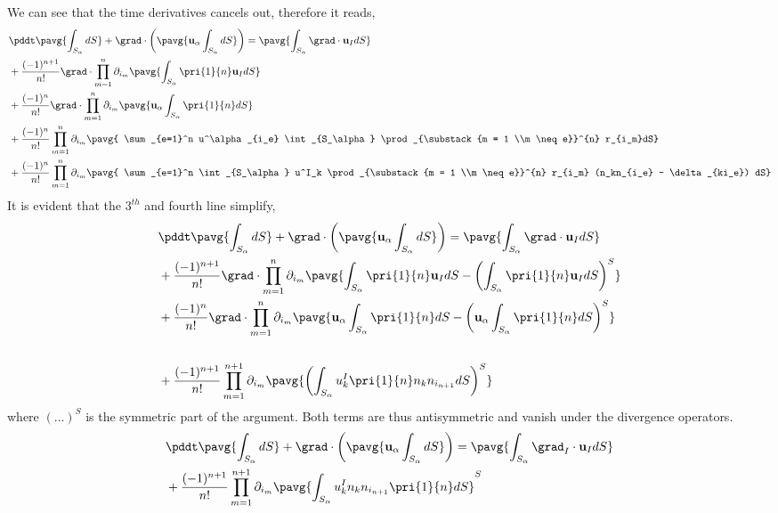 We can see that the time derivatives cancels out, therefore it reads, 
\begin{align*}
    &\pddt \pavg{\int_{S_\alpha} dS}
     + \grad \cdot \left(
         \pavg{\textbf{u}_\alpha \int_{S_\alpha} dS} 
    \right)
    = \pavg{\int_{S_\alpha} \grad \cdot \textbf{u}_I dS} \\
    &+ \frac{(-1)^{n+1}}{n!}
    \grad\cdot\prod^{n}_{m=1}
    \partial_{i_m}
    \pavg{
    \int_{S_\alpha}
    \pri{1}{n} \textbf{u}_IdS}\\
    &+ \frac{(-1)^{n}}{n!}
    \grad \cdot
    \prod^{n}_{m=1}
    \partial_{i_m}
    \pavg{
     \textbf{u}_\alpha \int_{S_\alpha} \pri{1}{n}dS }\\
    & + \frac{(-1)^{n}}{n!}
    \prod^{n}_{m=1}
    \partial_{i_m}
    \pavg{
    \sum_{e=1}^n u^\alpha_{i_e} \int_{S_\alpha} 
    \prod_{\substack{m = 1 \\m \neq e}}^{n} r_{i_m}dS} \\
    & +  \frac{(-1)^{n}}{n!}
    \prod^{n}_{m=1}
    \partial_{i_m}
    \pavg{
    \sum_{e=1}^n \int_{S_\alpha} u^I_k
    \prod_{\substack{m = 1 \\m \neq e}}^{n} r_{i_m}
    (n_kn_{i_e} - \delta_{ki_e}) dS}
\end{align*}
It is evident that the $3^{th}$ and fourth line simplify, 
\begin{align*}
    &\pddt \pavg{\int_{S_\alpha} dS}
     + \grad \cdot \left(
         \pavg{\textbf{u}_\alpha \int_{S_\alpha} dS} 
    \right)
    = \pavg{\int_{S_\alpha} \grad \cdot \textbf{u}_I dS} \\
    &+ \frac{(-1)^{n+1}}{n!}
    \grad\cdot\prod^{n}_{m=1}
    \partial_{i_m}
    \pavg{
    \int_{S_\alpha}
    \pri{1}{n} \textbf{u}_IdS - 
    \left(
        \int_{S_\alpha}
        \pri{1}{n} \textbf{u}_IdS
    \right)^S}\\
    &+ \frac{(-1)^{n}}{n!}
    \grad \cdot
    \prod^{n}_{m=1}
    \partial_{i_m}
    \pavg{
     \textbf{u}_\alpha \int_{S_\alpha} \pri{1}{n}dS 
     - \left(\textbf{u}_\alpha \int_{S_\alpha} \pri{1}{n} dS\right)^S }\\\\
    & +  \frac{(-1)^{n+1}}{n!}
    \prod^{n+1}_{m=1}
    \partial_{i_m}
    \pavg{\left(\int_{S_\alpha} u^I_k
    \pri{1}{n} n_kn_{i_{n+1}}  dS\right)^S}
\end{align*}
where $(...)^S$ is the symmetric part of the argument. 
Both terms are thus antisymmetric and vanish under the divergence operators. 
\begin{align*}
    &\pddt \pavg{\int_{S_\alpha} dS}
     + \grad \cdot \left(
         \pavg{\textbf{u}_\alpha \int_{S_\alpha} dS} 
    \right)
    = \pavg{\int_{S_\alpha} \grad_I \cdot \textbf{u}_I dS} \\
    & +  \frac{(-1)^{n+1}}{n!}
    \prod^{n+1}_{m=1}
    \partial_{i_m}
    \pavg{\int_{S_\alpha} u^I_k n_kn_{i_{n+1}} \pri{1}{n} dS}^S
\end{align*}

